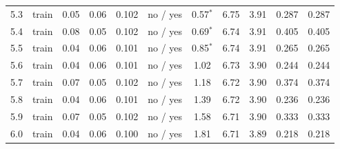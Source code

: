 {\begin{longtable}{llccccccccc}
\rule[-3pt]{0pt}{11.5pt} 5.3 & train & 0.05 & 0.06 & 0.102 & no / yes & 0.57$^{\ast}$ & 6.75 & 3.91 & 0.287 & 0.287 \\
\rule[-3pt]{0pt}{11.5pt} 5.4 & train & 0.08 & 0.05 & 0.102 & no / yes & 0.69$^{\ast}$ & 6.74 & 3.91 & 0.405 & 0.405 \\
\rule[-3pt]{0pt}{11.5pt} 5.5 & train & 0.04 & 0.06 & 0.101 & no / yes & 0.85$^{\ast}$ & 6.74 & 3.91 & 0.265 & 0.265 \\
\rule[-3pt]{0pt}{11.5pt} 5.6 & train & 0.04 & 0.06 & 0.101 & no / yes & 1.02 & 6.73 & 3.90 & 0.244 & 0.244 \\
\rule[-3pt]{0pt}{11.5pt} 5.7 & train & 0.07 & 0.05 & 0.102 & no / yes & 1.18 & 6.72 & 3.90 & 0.374 & 0.374 \\
\rule[-3pt]{0pt}{11.5pt} 5.8 & train & 0.04 & 0.06 & 0.101 & no / yes & 1.39 & 6.72 & 3.90 & 0.236 & 0.236 \\
\rule[-3pt]{0pt}{11.5pt} 5.9 & train & 0.07 & 0.05 & 0.102 & no / yes & 1.58 & 6.71 & 3.90 & 0.333 & 0.333 \\
\rule[-3pt]{0pt}{11.5pt} 6.0 & train & 0.04 & 0.06 & 0.100 & no / yes & 1.81 & 6.71 & 3.89 & 0.218 & 0.218 \\
\bottomrule
\end{longtable}}
